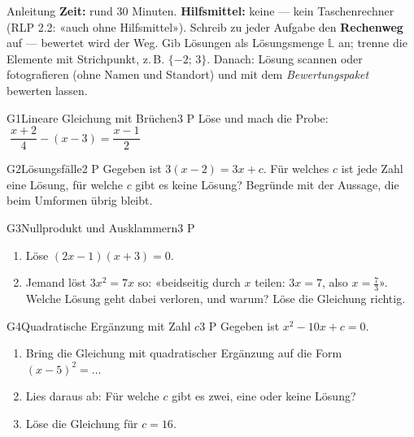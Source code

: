 \documentclass[11pt]{article}
\begin{document}

\begin{lpinfo}{Anleitung}
\textbf{Zeit:} rund 30 Minuten. \textbf{Hilfsmittel:} keine — kein Taschenrechner (RLP 2.2: «auch ohne Hilfsmittel»).
Schreib zu jeder Aufgabe den \textbf{Rechenweg} auf — bewertet wird der Weg. Gib Lösungen als Lösungsmenge $\mathbb{L}$ an; trenne die Elemente mit Strichpunkt, z.\,B. $\{-2;\, 3\}$.
Danach: Lösung scannen oder fotografieren (ohne Namen und Standort) und mit dem \emph{Bewertungspaket} bewerten lassen.
\end{lpinfo}


\begin{lpaufgabe}{G1}{Lineare Gleichung mit Brüchen}{3 P}
Löse und mach die Probe: $\;\dfrac{x + 2}{4} - (x - 3) = \dfrac{x - 1}{2}$
\end{lpaufgabe}

\begin{lpaufgabe}{G2}{Lösungsfälle}{2 P}
Gegeben ist $3(x - 2) = 3x + c$. Für welches $c$ ist jede Zahl eine Lösung, für welche $c$ gibt es keine Lösung?
Begründe mit der Aussage, die beim Umformen übrig bleibt.
\end{lpaufgabe}

\begin{lpaufgabe}{G3}{Nullprodukt und Ausklammern}{3 P}
\begin{enumerate}[label=(\alph*),leftmargin=*,itemsep=1pt]
\item Löse $(2x - 1)(x + 3) = 0$.
\item Jemand löst $3x^2 = 7x$ so: «beidseitig durch $x$ teilen: $3x = 7$, also $x = \tfrac{7}{3}$». Welche Lösung geht dabei verloren, und warum? Löse die Gleichung richtig.
\end{enumerate}
\end{lpaufgabe}


\begin{lpaufgabe}{G4}{Quadratische Ergänzung mit Zahl \texorpdfstring{$c$}{c}}{3 P}
Gegeben ist $x^2 - 10x + c = 0$.
\begin{enumerate}[label=(\alph*),leftmargin=*,itemsep=1pt]
\item Bring die Gleichung mit quadratischer Ergänzung auf die Form $(x - 5)^2 = \ldots$
\item Lies daraus ab: Für welche $c$ gibt es zwei, eine oder keine Lösung?
\item Löse die Gleichung für $c = 16$.
\end{enumerate}
\end{lpaufgabe}
\end{document}
